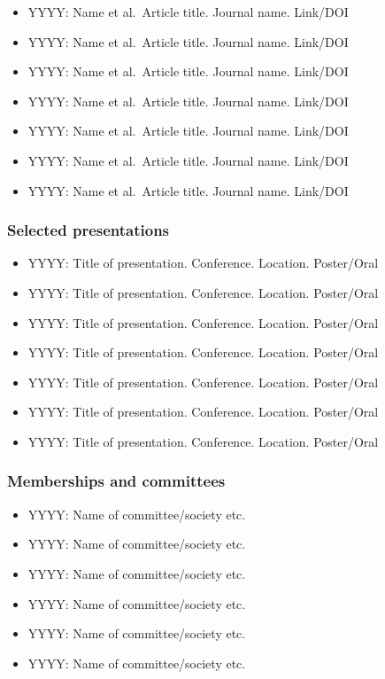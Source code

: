 \documentclass[11pt, a4paper]{article}
\providecommand{\tightlist}{%
  \setlength{\itemsep}{0pt}\setlength{\parskip}{0pt}}
\begin{document}
\begin{raggedright}
\begin{itemize}
\tightlist
\item
  YYYY: Name et al.~Article title. Journal name. Link/DOI
\item
  YYYY: Name et al.~Article title. Journal name. Link/DOI
\item
  YYYY: Name et al.~Article title. Journal name. Link/DOI
\item
  YYYY: Name et al.~Article title. Journal name. Link/DOI
\item
  YYYY: Name et al.~Article title. Journal name. Link/DOI
\item
  YYYY: Name et al.~Article title. Journal name. Link/DOI
\item
  YYYY: Name et al.~Article title. Journal name. Link/DOI
\end{itemize}

\subsubsection{Selected presentations}

\begin{itemize}
\tightlist
\item
  YYYY: Title of presentation. Conference. Location. Poster/Oral
\item
  YYYY: Title of presentation. Conference. Location. Poster/Oral
\item
  YYYY: Title of presentation. Conference. Location. Poster/Oral
\item
  YYYY: Title of presentation. Conference. Location. Poster/Oral
\item
  YYYY: Title of presentation. Conference. Location. Poster/Oral
\item
  YYYY: Title of presentation. Conference. Location. Poster/Oral
\item
  YYYY: Title of presentation. Conference. Location. Poster/Oral
\end{itemize}

\subsubsection{Memberships and committees}

\begin{itemize}
\tightlist
\item
  YYYY: Name of committee/society etc.
\item
  YYYY: Name of committee/society etc.
\item
  YYYY: Name of committee/society etc.
\item
  YYYY: Name of committee/society etc.
\item
  YYYY: Name of committee/society etc.
\item
  YYYY: Name of committee/society etc.
\end{itemize}


\end{raggedright}
\end{document}
